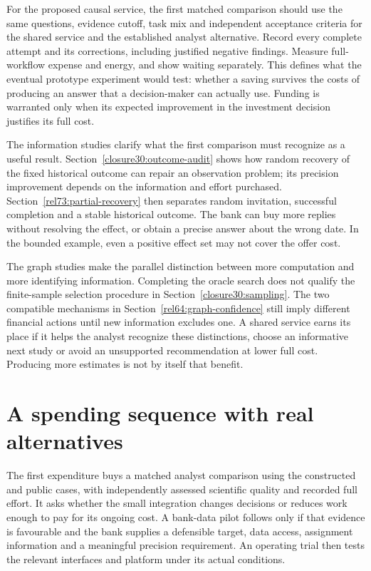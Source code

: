 For the proposed causal service, the first matched comparison should use
the same questions, evidence cutoff, task mix and independent acceptance
criteria for the shared service and the established analyst alternative.
Record every complete attempt and its corrections, including justified
negative findings. Measure full-workflow expense and energy, and show
waiting separately. This defines what the eventual prototype experiment
would test: whether a saving survives the costs of producing an answer
that a decision-maker can actually use. Funding is warranted only when
its expected improvement in the investment decision justifies its full
cost.

The information studies clarify what the first comparison must recognize as
a useful result. Section~\ref{closure30:outcome-audit} shows how random
recovery of the fixed historical outcome can repair an observation problem;
its precision improvement
depends on the information and effort purchased. Section~\ref{rel73:partial-recovery}
then separates random invitation, successful completion and a stable historical
outcome. The bank can buy more replies without resolving the effect, or obtain
a precise answer about the wrong date. In the bounded example, even a positive
effect set may not cover the offer cost.

The graph studies make the parallel distinction between more computation and
more identifying information. Completing the oracle search does not qualify
the finite-sample selection procedure in Section~\ref{closure30:sampling}.
The two compatible mechanisms in Section~\ref{rel64:graph-confidence} still
imply different financial actions until new information excludes one. A shared
service earns its place if it helps the analyst recognize these distinctions,
choose an informative next study or avoid an unsupported recommendation at
lower full cost. Producing more estimates is not by itself that benefit.

\section{A spending sequence with real alternatives}
The first expenditure buys a matched analyst comparison using the
constructed and public cases, with independently assessed scientific
quality and recorded full effort. It asks whether the small integration
changes decisions or reduces work enough to pay for its ongoing cost.
A bank-data pilot follows only if that evidence is favourable and the
bank supplies a defensible target, data access, assignment information
and a meaningful precision requirement. An operating trial then tests
the relevant interfaces and platform under its actual conditions.

